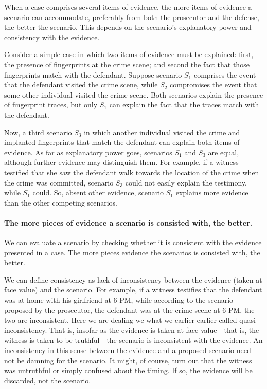 \documentclass[10pt]{article}
\begin{document}
When a case comprises several items of evidence, 
 the more items of evidence a scenario can accommodate, preferably from both the prosecutor and the defense, 
 the better the scenario. This depends on the scenario's explanatory power and consistency with the evidence. 
 
 Consider a simple case in which two items of evidence must be explained: first, the presence of fingerprints at the crime scene; 
and second the fact that those fingerprints match with the defendant.  Suppose scenario $S_1$ comprises the event that the 
defendant visited the crime scene, while $S_2$ compromises the event that some other individual visited the crime scene. Both scenarios 
explain the presence of fingerprint traces, but only $S_1$ can explain the fact that the traces match with the defendant. 

Now, a third scenario $S_3$ in which another individual visited the crime and  implanted fingerprints that match the defendant can explain both items of evidence. As far as explanatory power goes, scenarios $S_1$ and $S_3$ are equal, although further evidence may distinguish them. For example, if a witness testified that she saw the defendant walk towards the location of the crime when the crime was committed, scenario $S_3$ could 
not easily explain the testimony, while $S_1$ could. So, absent other evidence, scenario $S_1$ explains more evidence than the other competing scenarios. 
 

\paragraph{The more pieces of evidence a scenario is consisted with, the better.}

We can evaluate a scenario by checking whether it is 
consistent with the evidence presented in a case. 
The more pieces evidence the scenarios 
is consisted with, the better.

We can define consistency as lack of inconsistency between the evidence (taken at face value) and the scenario. 
For example, if a witness testifies that the defendant was at home with his girlfriend 
at 6 PM, while according to the scenario proposed by the prosecutor, 
the defendant was at the crime scene at 6 PM, the 
two are inconsistent. Here we are dealing we what we earlier earlier called quasi-inconsistency. That is, 
insofar as the evidence is taken at face value---that is, the witness is taken to be truthful---the scenario 
is inconsistent with the evidence. An inconsistency in this sense between the evidence and a proposed scenario need 
not be damning for the scenario.  It might, of course, turn out that the witness was untruthful or simply confused about 
the timing.  If so, the evidence will be discarded, not the scenario. 
\end{document}
